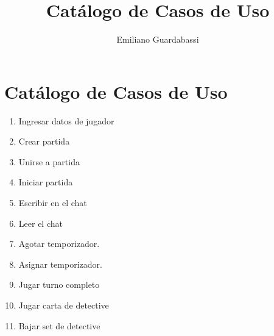 \documentclass[12pt,a4paper]{article}
\title{\textbf{Catálogo de Casos de Uso}}
\author{Emiliano Guardabassi}
\date{}
\begin{document}
\maketitle

\section*{Catálogo de Casos de Uso}

\begin{enumerate}[
  label=\textbf{Caso de Uso \#\arabic*:},
  labelsep=0.6em,   %
  labelwidth=3.5cm, %
  leftmargin=!,     %
  align=left        %
]
  \item Ingresar datos de jugador
  \item Crear partida
  \item Unirse a partida
  \item Iniciar partida
  \item Escribir en el chat
  \item Leer el chat
  \item Agotar temporizador.
  \item Asignar temporizador.
  \item Jugar turno completo
  \item Jugar carta de detective
  \item Bajar set de detective

\end{enumerate}
\end{document}
